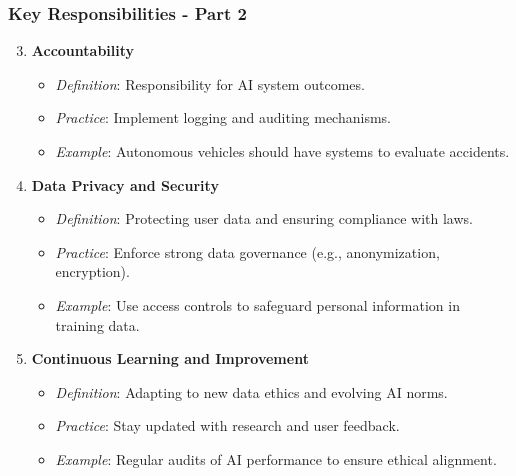 \documentclass[aspectratio=169]{beamer}
\begin{document}
\begin{frame}[fragile]
    \frametitle{Key Responsibilities - Part 2}
    \begin{enumerate}
        \setcounter{enumi}{2}
        \item \textbf{Accountability}
        \begin{itemize}
            \item \textit{Definition}: Responsibility for AI system outcomes.
            \item \textit{Practice}: Implement logging and auditing mechanisms.
            \item \textit{Example}: Autonomous vehicles should have systems to evaluate accidents.
        \end{itemize}

        \item \textbf{Data Privacy and Security}
        \begin{itemize}
            \item \textit{Definition}: Protecting user data and ensuring compliance with laws.
            \item \textit{Practice}: Enforce strong data governance (e.g., anonymization, encryption).
            \item \textit{Example}: Use access controls to safeguard personal information in training data.
        \end{itemize}

        \item \textbf{Continuous Learning and Improvement}
        \begin{itemize}
            \item \textit{Definition}: Adapting to new data ethics and evolving AI norms.
            \item \textit{Practice}: Stay updated with research and user feedback.
            \item \textit{Example}: Regular audits of AI performance to ensure ethical alignment.
        \end{itemize}
    \end{enumerate}
\end{frame}
\end{document}
